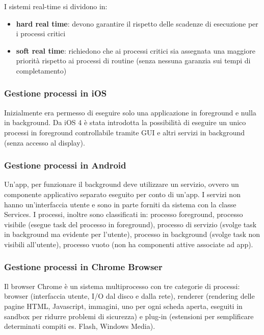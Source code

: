 \documentclass[a4paper]{article}
\begin{document}
I sistemi real-time si dividono in:
\begin{itemize}
	\item \textbf{hard real time}: devono garantire il rispetto delle scadenze di esecuzione per i processi critici 
	\item \textbf{soft real time}: richiedono che ai processi critici sia assegnata una maggiore priorità rispetto ai
	processi di routine (senza nessuna garanzia sui tempi di completamento)
\end{itemize}

\subsubsection*{Gestione processi in iOS}
Inizialmente era permesso di eseguire solo una applicazione in foreground e nulla in background. Da iOS 4 è stata introdotta la
possibilità di eseguire un unico processi in foreground controllabile tramite GUI e altri servizi in background (senza accesso
al display).

\subsubsection*{Gestione processi in Android}
Un'app, per funzionare il background deve utilizzare un servizio, ovvero un componente applicativo separato eseguito per conto
di un'app. I servizi non hanno un'interfaccia utente e sono in parte forniti da sistema con la classe Services. I processi,
inoltre sono classificati in: processo foreground, processo visibile (esegue task del processo in foreground), processo di
servizio (svolge task in background ma evidente per l'utente), processo in background (svolge task non visibili all'utente),
processo vuoto (non ha componenti attive associate ad app).

\subsubsection*{Gestione processi in Chrome Browser}
Il browser Chrome è un sistema multiprocesso con tre categorie di processi: browser (interfaccia utente, I/O dal disco e dalla
rete), renderer (rendering delle pagine HTML, Javascript, immagini, uno per ogni scheda aperta, eseguiti in sandbox per ridurre
problemi di sicurezza) e plug-in (estensioni per semplificare determinati compiti es. Flash, Windows Media).

\end{document}
